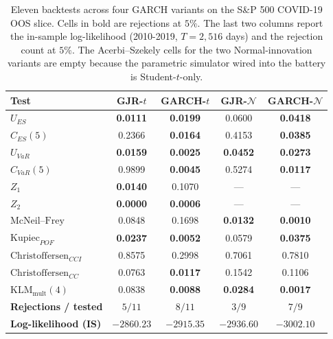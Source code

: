 \documentclass[11pt,a4paper]{article}
\theoremstyle{plain}
\begin{document}
\begin{table}[ht]
\centering
\caption{Eleven backtests across four GARCH variants on the S\&P 500
COVID-19 OOS slice. Cells in bold are rejections at $5\%$. The last
two columns report the in-sample log-likelihood (2010-2019,
$T = 2{,}516$ days) and the rejection count at $5\%$. The
Acerbi--Szekely cells for the two Normal-innovation variants are
empty because the parametric simulator wired into the battery is
Student-$t$-only.}
\label{tab:multi-model}
\small
\setlength{\tabcolsep}{5pt}
\begin{tabular}{@{}l*{4}{S[table-format=1.4]}@{}}
\toprule
\textbf{Test} & {\textbf{GJR-$t$}} & {\textbf{GARCH-$t$}} & {\textbf{GJR-$\mathcal{N}$}} & {\textbf{GARCH-$\mathcal{N}$}} \\
\midrule
$U_{ES}$              & \bfseries 0.0111 & \bfseries 0.0199 & 0.0600           & \bfseries 0.0418 \\
$C_{ES}(5)$           & 0.2366           & \bfseries 0.0164 & 0.4153           & \bfseries 0.0385 \\
$U_{VaR}$             & \bfseries 0.0159 & \bfseries 0.0025 & \bfseries 0.0452 & \bfseries 0.0273 \\
$C_{VaR}(5)$          & 0.9899           & \bfseries 0.0045 & 0.5274           & \bfseries 0.0117 \\
$Z_1$                 & \bfseries 0.0140 & 0.1070           & {---}            & {---}            \\
$Z_2$                 & \bfseries 0.0000 & \bfseries 0.0006 & {---}            & {---}            \\
$\mathrm{McNeil}\text{--}\mathrm{Frey}$ & 0.0848 & 0.1698 & \bfseries 0.0132 & \bfseries 0.0010 \\
$\mathrm{Kupiec}_{POF}$         & \bfseries 0.0237 & \bfseries 0.0052 & 0.0579           & \bfseries 0.0375 \\
$\mathrm{Christoffersen}_{CCI}$ & 0.8575           & 0.2998           & 0.7061           & 0.7810           \\
$\mathrm{Christoffersen}_{CC}$  & 0.0763           & \bfseries 0.0117 & 0.1542           & 0.1106           \\
$\mathrm{KLM}_{\text{mult}}(4)$ & 0.0838           & \bfseries 0.0088 & \bfseries 0.0284 & \bfseries 0.0017 \\
\midrule
\textbf{Rejections / tested}    & {$5/11$}         & {$8/11$}         & {$3/9$}          & {$7/9$}          \\
\textbf{Log-likelihood (IS)}    & {$-2860.23$}     & {$-2915.35$}     & {$-2936.60$}     & {$-3002.10$}     \\
\bottomrule
\end{tabular}
\end{table}
\end{document}
